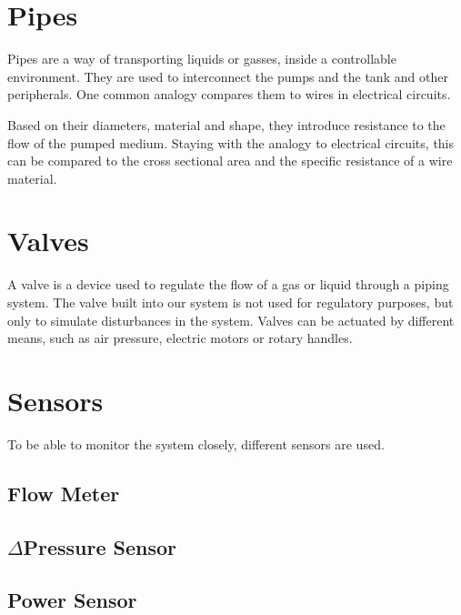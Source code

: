 \section{Pipes}
Pipes are a way of transporting liquids or gasses, inside a controllable environment.
They are used to interconnect the pumps and the tank and other peripherals.
One common analogy compares them to wires in electrical circuits.

Based on their diameters, material and shape,
they introduce resistance to the flow of the pumped medium.
Staying with the analogy to electrical circuits,
this can be compared to the cross sectional area and the specific resistance of a wire material.

\section{Valves}
A valve is a device used to regulate the flow of a gas or liquid through a piping system.
The valve built into our system is not used for regulatory purposes,
but only to simulate disturbances in the system.
Valves can be actuated by different means, such as air pressure, electric motors or rotary handles.

\section{Sensors}
To be able to monitor the system closely, different sensors are used.

\subsection{Flow Meter}
\subsection{$\Delta$Pressure Sensor}
\subsection{Power Sensor}

